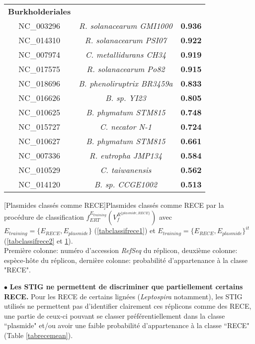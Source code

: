 \begin{landscape}
\begin{table}
\begin{minipage}[t]{0.5\textwidth}
\begin{tiny}
\begin{tabular}{c>{\itshape}c>{\bfseries}c}
\hline
\multicolumn{1}{l}{\textbf{Burkholderiales}}\\
NC\_003296&R. solanacearum GMI1000&0.936\\
NC\_014310&R. solanacearum PSI07&0.922\\
NC\_007974&C. metallidurans CH34&0.919\\
NC\_017575&R. solanacearum Po82&0.915\\
NC\_018696&B. phenoliruptrix BR3459a&0.833\\
NC\_016626&B. sp. YI23&0.805\\
NC\_010625&B. phymatum STM815&0.748\\
NC\_015727&C. necator N-1&0.724\\
NC\_010627&B. phymatum STM815&0.661\\
NC\_007336&R. eutropha JMP134&0.584\\
NC\_010529&C. taiwanensis&0.562\\
NC\_014120&B. sp. CCGE1002&0.513\\
	  \end{tabular}
	  \end{tiny}
	  	 \label{tabclassifrece3}
	  \end{minipage}
	  \end{table}
\end{landscape}


\begin{table}[H]
[Plasmides classés comme RECE]{Plasmides classés comme RECE par la procédure de classification $f_{ERT}^{E_{training}}(V_{f}^{R^{\{plasmide,RECE\}}})$ avec $E_{training}=\{E_{RECE},E_{plasmide}\}$ (\ref{tabclassifrece1}) et $E_{training}=\{E_{RECE},E_{plasmide}\}^{it}$ (\ref{tabclassifrece2} et \ref{tabclassifrece3}). \\ Première colonne: numéro d'accession \textit{RefSeq} du réplicon, deuxième colonne: espèce-hôte du réplicon, dernière colonne: probabilité d'appartenance à la classe "RECE". }\label{tabclassifplasmid}
\end{table}

$\bullet$ \textbf{Les STIG ne permettent de discriminer que partiellement certains RECE.} Pour les RECE de certains lignées (\textit{Leptospira} notamment), les STIG utilisés ne permettent pas d'identifier clairement ces réplicons comme des RECE, une partie de ceux-ci pouvant se classer préférentiellement dans la classe ``plasmide" et/ou avoir une faible probabilité d'appartenance à la classe ``RECE" (Table \ref{tabrecemean}). 

